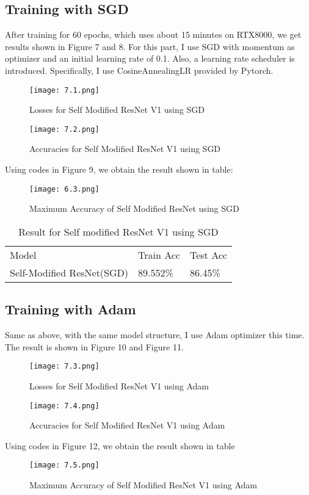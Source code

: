 \documentclass[letterpaper]{article} %
\begin{document}
\subsection{Training with SGD}
After training for 60 epochs, which uses about 15 minutes on RTX8000, we get results shown in Figure 7 and 8. For this part, I use SGD with momentum as optimizer and an initial learning rate of 0.1. Also, a learning rate scheduler is introduced. Specifically, I use CosineAnnealingLR provided by Pytorch.
\begin{figure}[H]
	\centering
	\texttt{[image: 7.1.png]}
	\caption{Losses for Self Modified ResNet V1 using SGD}
\end{figure}
\begin{figure}[H]
	\centering
	\texttt{[image: 7.2.png]}
	\caption{Accuracies for Self Modified ResNet V1 using SGD}
\end{figure}
Using codes in Figure 9, we obtain the result shown in table:
\begin{figure}[H]
	\centering
	\texttt{[image: 6.3.png]}
	\caption{Maximum Accuracy of Self Modified ResNet using SGD}
\end{figure}
\begin{table}[H]
	\centering
	\begin{tabular}{l|l|l}
    Model & Train Acc & Test Acc\\
    Self-Modified ResNet(SGD) & 89.552\%  & 86.45\%  \\
	\end{tabular}
	\caption{Result for Self modified ResNet V1 using SGD}
\end{table}
\subsection{Training with Adam}
Same as above, with the same model structure, I use Adam optimizer this time. The result is shown in Figure 10 and Figure 11.
\begin{figure}[H]
	\centering
	\texttt{[image: 7.3.png]}
	\caption{Losses for Self Modified ResNet V1 using Adam}
\end{figure}
\begin{figure}[H]
	\centering
	\texttt{[image: 7.4.png]}
	\caption{Accuracies for Self Modified ResNet V1 using Adam}
\end{figure}
Using codes in Figure 12, we obtain the result shown in table
\begin{figure}[H]
	\centering
	\texttt{[image: 7.5.png]}
	\caption{Maximum Accuracy of Self Modified ResNet V1 using Adam}
\end{figure}
\end{document}
